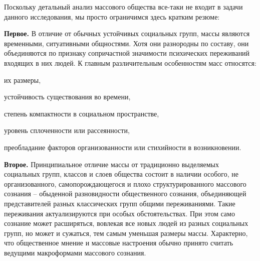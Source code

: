 Поскольку детальный анализ массового общества все-таки не входит в задачи данного исследования,
мы просто ограничимся здесь кратким резюме:

\textbf{Первое.} В отличие от обычных устойчивых социальных групп, массы являются временными,
  ситуативными общностями. Хотя они разнородны по составу, они объединяются по признаку сопричастной
  значимости психических переживаний входящих в них людей. К главным различительным особенностям масс
  относятся:
  \begin{enumerate*}[label=\asbuk*)]
  \item их размеры,
  \item устойчивость существования во времени,
  \item степень компактности в социальном пространстве,
  \item уровень сплоченности или рассеянности,
  \item преобладание факторов организованности или стихийности в возникновении.
  \end{enumerate*}
  
\textbf{Второе.} Принципиальное отличие массы от традиционно выделяемых социальных групп,
  классов и слоев общества состоит в наличии особого, не организованного, самопорождающегося и
  плохо структурированного массового сознания -- обыденной разновидности общественного сознания,
  объединяющей представителей разных классических групп общими переживаниями. Такие переживания
  актуализируются при особых обстоятельствах. При этом само сознание может расширяться, вовлекая
  все новых людей из разных социальных групп, но может и сужаться, тем самым уменьшая размеры массы.
  Характерно, что общественное мнение и массовые настроения обычно принято считать ведущими макроформами
  массового сознания.

